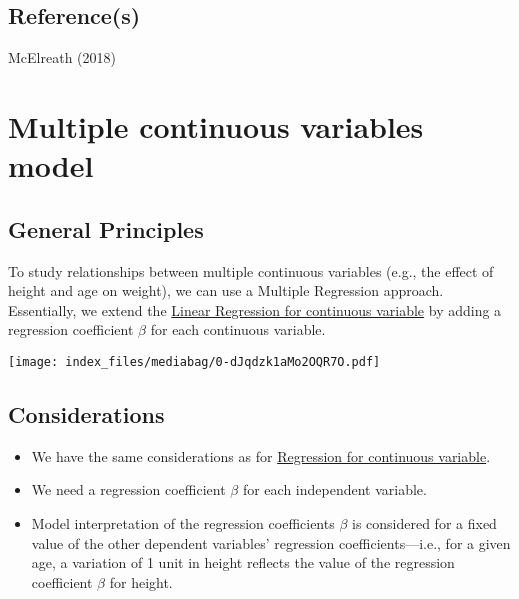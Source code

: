 \documentclass[
  letterpaper,
  DIV=11,
  numbers=noendperiod]{scrreprt}
\begin{document}
\section{Reference(s)}\label{references}

McElreath (2018)


\chapter{Multiple continuous variables
model}\label{multiple-continuous-variables-model}

\section{General Principles}\label{general-principles-1}

To study relationships between multiple continuous variables (e.g., the
effect of height and age on weight), we can use a Multiple Regression
approach. Essentially, we extend the
\href{1.\%20Linear\%20Regression\%20for\%20continuous\%20variable.qmd}{Linear
Regression for continuous variable} by adding a regression coefficient
\(\beta\) for each continuous variable.

\texttt{[image: index\_files/mediabag/0-dJqdzk1aMo2OQR7O.pdf]}

\section{Considerations}\label{considerations-1}

\begin{tcolorbox}[enhanced jigsaw, toptitle=1mm, opacityback=0, titlerule=0mm, breakable, bottomrule=.15mm, colframe=quarto-callout-caution-color-frame, arc=.35mm, coltitle=black, left=2mm, opacitybacktitle=0.6, leftrule=.75mm, toprule=.15mm, rightrule=.15mm, bottomtitle=1mm, colbacktitle=quarto-callout-caution-color!10!white, title=\textcolor{quarto-callout-caution-color}{\faFire}\hspace{0.5em}{Caution}, colback=white]

\begin{itemize}
\item
  We have the same considerations as for
  \href{1.\%20Linear\%20Regression\%20for\%20continuous\%20variable.qmd}{Regression
  for continuous variable}.
\item
  We need a regression coefficient \(\beta\) for each independent
  variable.
\item
  Model interpretation of the regression coefficients \(\beta\) is
  considered for a fixed value of the other dependent variables'
  regression coefficients---i.e., for a given age, a variation of 1 unit
  in height reflects the value of the regression coefficient \(\beta\)
  for height.
\end{itemize}

\end{tcolorbox}
\end{document}
